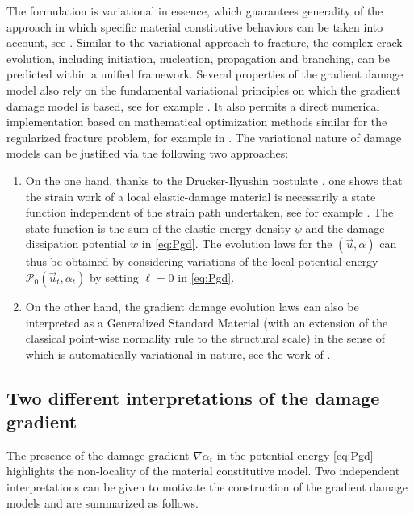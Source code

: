 The formulation is variational in essence, which guarantees generality of the approach in which specific material constitutive behaviors can be taken into account, see \cite{PhamMarigoMaurini:2011,PhamMarigo:2013}. Similar to the variational approach to fracture, the complex crack evolution, including initiation, nucleation, propagation and branching, can be predicted within a unified framework. Several properties of the gradient damage model also rely on the fundamental variational principles on which the gradient damage model is based, see for example \cite{SicsicMarigo:2013,SicsicMarigoMaurini:2013}. It also permits a direct numerical implementation based on mathematical optimization methods similar for the regularized fracture problem, for example in \cite{AmorMarigoMaurini:2009,PhamAmorMarigoMaurini:2011}. The variational nature of damage models can be justified via the following two approaches:
\begin{enumerate}
\item On the one hand, thanks to the Drucker-Ilyushin postulate \cite{Marigo:2002}, one shows that the strain work of a local elastic-damage material is necessarily a state function independent of the strain path undertaken, see for example \cite{PhamMarigo:2010}. The state function is the sum of the elastic energy density $\psi$ and the damage dissipation potential $w$ in \eqref{eq:Pgd}. The evolution laws for the $(\vec{u},\alpha)$ can thus be obtained by considering variations of the local potential energy $\mathcal{P}_0(\vec{u}_t,\alpha_t)$ by setting $\ell=0$ in \eqref{eq:Pgd}.

\item On the other hand, the gradient damage evolution laws can also be interpreted as a Generalized Standard Material (with an extension of the classical point-wise normality rule to the structural scale) in the sense of \cite{Halphen:1975aa} which is automatically variational in nature, see the work of \cite{LorentzAndrieux:1999,LorentzBenallal:2005}.
\end{enumerate}

\subsection{Two different interpretations of the damage gradient} \label{sec:twointerpretations}
The presence of the damage gradient $\nabla\alpha_t$ in the potential energy \eqref{eq:Pgd} highlights the non-locality of the material constitutive model. Two independent interpretations can be given to motivate the construction of the gradient damage models and are summarized as follows.

